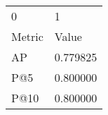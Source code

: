 \begin{tabular}{ll}
0 & 1 \\
Metric & Value \\
AP & 0.779825 \\
P@5 & 0.800000 \\
P@10 & 0.800000 \\
\end{tabular}

